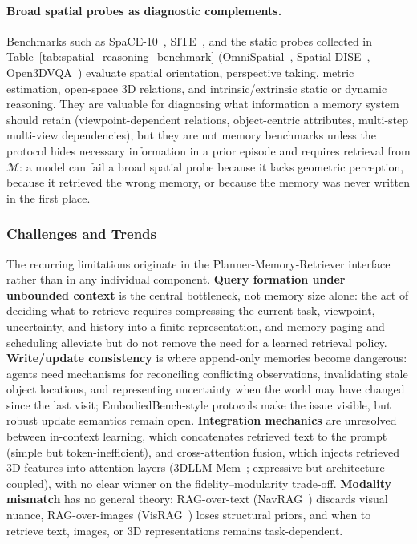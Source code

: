 \paragraph{Broad spatial probes as diagnostic complements.}
Benchmarks such as SpaCE-10~\cite{gong2025space10}, SITE~\cite{wang2025site}, and the static probes collected in Table~\ref{tab:spatial_reasoning_benchmark} (OmniSpatial~\cite{jia2025omnispatial}, Spatial-DISE~\cite{huang2025spatialdise}, Open3DVQA~\cite{zhang2025open3dvqa}) evaluate spatial orientation, perspective taking, metric estimation, open-space 3D relations, and intrinsic/extrinsic static or dynamic reasoning. They are valuable for diagnosing what information a memory system should retain (viewpoint-dependent relations, object-centric attributes, multi-step multi-view dependencies), but they are not memory benchmarks unless the protocol hides necessary information in a prior episode and requires retrieval from $\mathcal{M}$: a model can fail a broad spatial probe because it lacks geometric perception, because it retrieved the wrong memory, or because the memory was never written in the first place.


\subsubsection{Challenges and Trends}
The recurring limitations originate in the Planner-Memory-Retriever interface rather than in any individual component.
\textbf{Query formation under unbounded context} is the central bottleneck, not memory size alone: the act of deciding what to retrieve requires compressing the current task, viewpoint, uncertainty, and history into a finite representation, and memory paging and scheduling alleviate but do not remove the need for a learned retrieval policy.
\textbf{Write/update consistency} is where append-only memories become dangerous: agents need mechanisms for reconciling conflicting observations, invalidating stale object locations, and representing uncertainty when the world may have changed since the last visit; EmbodiedBench-style protocols make the issue visible, but robust update semantics remain open.
\textbf{Integration mechanics} are unresolved between in-context learning, which concatenates retrieved text to the prompt (simple but token-inefficient), and cross-attention fusion, which injects retrieved 3D features into attention layers (3DLLM-Mem~\cite{hu20253dllmmem}; expressive but architecture-coupled), with no clear winner on the fidelity--modularity trade-off.
\textbf{Modality mismatch} has no general theory: RAG-over-text (NavRAG~\cite{wang2025navrag}) discards visual nuance, RAG-over-images (VisRAG~\cite{yu2024visrag}) loses structural priors, and when to retrieve text, images, or 3D representations remains task-dependent.

